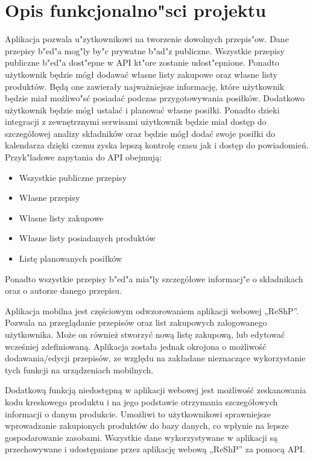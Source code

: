\documentclass{article}
\begin{document}

\tableofcontents

\section{Opis funkcjonalno"sci projektu}
Aplikacja pozwala u"zytkownikowi na tworzenie dowolnych przepis"ow. Dane przepisy b"ed"a mog"ly by"c prywatne b"ad"z publiczne. Wszystkie przepisy publiczne b"ed"a dost"epne w API kt"ore zostanie udost"epnione. Ponadto użytkownik będzie mógł dodawać własne listy zakupowe oraz własne listy produktów. Będą one zawierały najważniejsze informację, które użytkownik będzie miał możliwo"sć posiadać podczas przygotowywania posiłków. Dodatkowo użytkownik będzie mógł ustalać i planować własne posiłki. Ponadto dzieki integracji z zewnętrznymi serwisami użytkownik będzie miał dostęp do szczegółowej analizy składników oraz będzie mógł dodać swoje posiłki do kalendarza dzięki czemu zyska lepszą kontrolę czasu jak i dostęp do powiadomień. Przyk"ladowe zapytania do API obejmują:
\begin{itemize}
	\item Wszystkie publiczne  przepisy
	\item Własne przepisy
	\item Własne listy zakupowe
	\item Własne listy posiadanych produktów
	\item Listę planowanych posiłków
\end{itemize}
Ponadto wszystkie przepisy b"ed"a mia"ly szczegółowe informacj"e o składnikach oraz o autorze danego przepisu. \par
Aplikacja mobilna jest częściowym odwzorowaniem aplikacji webowej „ReShP”. Pozwala na przeglądanie przepisów oraz list zakupowych zalogowanego użytkownika. Może on również stworzyć nową listę zakupową, lub edytować wcześniej zdefiniowaną. Aplikacja została jednak okrojona o możliwość dodawania/edycji przepisów, ze względu na zakładane nieznaczące wykorzystanie tych funkcji na urządzeniach mobilnych. \par
Dodatkową funkcją niedostępną w aplikacji webowej jest możliwość zeskanowania kodu kreskowego produktu i na jego podstawie otrzymania szczegółowych informacji o danym produkcie. Umożliwi to użytkownikowi sprawniejsze wprowadzanie zakupionych produktów do bazy danych, co wpłynie na lepsze gospodarowanie zasobami. Wszystkie dane wykorzystywane w aplikacji są przechowywane i udostępniane przez aplikację webową „ReShP” za pomocą API.
\end{document}
